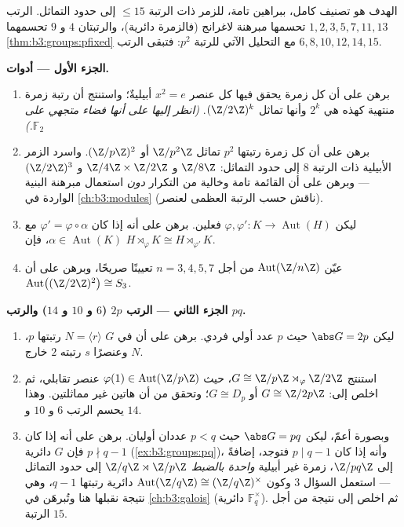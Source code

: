 \begin{problem}\label{pb:b3:groups:1}
الهدف هو تصنيف كامل، ببراهين تامة، للزمر ذات الرتبة $\leq 15$ إلى
حدود التماثل. الرتب $1, 2, 3, 5,
7, 11, 13$ تحسمها مبرهنة لاغرانج (فالزمرة
دائرية)، والرتبتان $4$ و $9$ تحسمهما \cref{thm:b3:groups:pfixed} مع التحليل
الآتي للرتبة $p^2$: فتبقى الرتب $6, 8, 10, 12, 14, 15$.

\medskip
\noindent\textbf{الجزء الأول --- أدوات.}
\begin{enumerate}
  \item برهن على أن كل زمرة يحقق فيها كل عنصر $x^2 =
        e$ أبيليةٌ؛
        واستنتج أن رتبة زمرة منتهية كهذه هي $2^k$ وأنها تماثل
        $(\Z/2\Z)^k$. \emph{(انظر إليها على أنها فضاء متجهي
        على $\mathbb F_2$.)}
  \item برهن على أن كل زمرة رتبتها $p^2$ تماثل $\Z/p^2\Z$
        أو $(\Z/p\Z)^2$. واسرد الزمر الأبيلية ذات الرتبة $8$
        إلى حدود التماثل: $\Z/8\Z$ و $\Z/4\Z \times
        \Z/2\Z$ و $(\Z/2\Z)^3$ ---
        وبرهن على أن القائمة تامة وخالية من التكرار \emph{دون}
        استعمال مبرهنة البنية الواردة في \cref{ch:b3:modules} (ناقش حسب
        الرتبة العظمى لعنصر).
  \item ليكن $\varphi, \varphi' \colon K \to \operatorname{Aut}(H)$ فعلين. برهن على أنه إذا كان $\varphi' = \varphi \circ
        \alpha$ مع
        $\alpha \in \operatorname{Aut}(K)$، فإن $H
        \rtimes_{\varphi} K \cong H \rtimes_{\varphi'} K$.
  \item عيّن $\operatorname{Aut}(\Z/n\Z)$ من أجل $n = 3, 4, 5,
        7$ تعيينًا صريحًا، وبرهن على
        أن $\operatorname{Aut}\bigl((\Z/2\Z)^2
        \bigr) \cong S_3$.
\end{enumerate}

\medskip
\noindent\textbf{الجزء الثاني --- الرتب $2p$ ($6$ و $10$ و $14$)
والرتب $pq$.}
\begin{enumerate}[resume]
  \item ليكن $\abs G = 2p$ حيث $p$ عدد أولي فردي. برهن على أن في
        $G$  $N = \langle r \rangle$ رتبتها $p$، وعنصرًا
        $s$ رتبته $2$ خارج $N$.
  \item استنتج $G \cong \Z/p\Z \rtimes_\varphi \Z/2\Z$، حيث $\varphi(1) \in \operatorname{Aut}(\Z/p\Z)$ عنصر تقابلي، ثم اخلص إلى:
        $G \cong \Z/2p\Z$ أو $G \cong
        D_p$؛ وتحقق من أن هاتين غير مماثلتين.
        وهذا يحسم الرتب $6$ و $10$ و $14$.
  \item وبصورة أعمّ، ليكن $\abs G = pq$ حيث $p < q$ عددان أوليان.
        برهن على أنه إذا كان $p \nmid q-1$ فإن $G$ دائرية
        (\cref{ex:b3:groups:pq})، وأنه إذا كان $p \mid q - 1$ فتوجد، إضافةً
        إلى $\Z/pq\Z$، زمرة غير أبيلية \emph{واحدة بالضبط}
        $\Z/q\Z \rtimes \Z/p\Z$ إلى حدود التماثل --- استعمل السؤال 3 وكون
        $\operatorname{Aut}(\Z/q\Z) \cong
        (\Z/q\Z)^\times$ دائرية رتبتها $q - 1$، وهي نتيجة نقبلها هنا
        وتُبرهَن في \cref{ch:b3:galois} (دائرية $\mathbb F_q^\times$). ثم اخلص إلى
        نتيجة من أجل الرتبة $15$.
\end{enumerate}


\end{problem}
